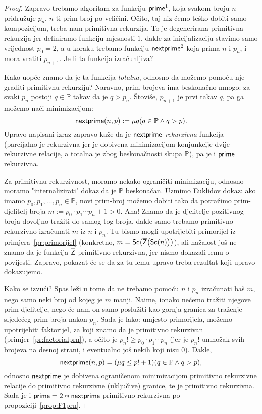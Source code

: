 \begin{proof}
Zapravo trebamo algoritam za funkciju $\mathsf{prime}^1$, koja svakom broju $n$ pridružuje $p_n$, $n$-ti prim-broj po veličini. Očito, taj niz ćemo teško dobiti samo kompozicijom, treba nam primitivna rekurzija. To je degenerirana primitivna rekurzija jer definiramo funkciju mjesnosti $1$, dakle za inicijalizaciju stavimo samo vrijednost $p_0=2$, a u koraku trebamo funkciju $\mathsf{nextprime}^2$ koja prima $n$ i $p_n$, i mora vratiti $p_{n+1}$. Je li ta funkcija izračunljiva?

Kako uopće znamo da je ta funkcija \emph{totalna}, odnosno da možemo pomoću nje graditi primitivnu rekurziju? Naravno, prim-brojeva ima beskonačno mnogo: za svaki $p_n$ postoji $q\in\mathbb P$ takav da je $q>p_n$. Štoviše, $p_{n+1}$ je prvi takav $q$, pa ga možemo naći minimizacijom:
\begin{equation}
    \mathsf{nextprime}(n,p):=\mu q(q\in\mathbb P\land q>p)\text.
\end{equation}
Upravo napisani izraz zapravo kaže da je $\mathsf{nextprime}$ \emph{rekurzivna} funkcija (parcijalno je rekurzivna jer je dobivena minimizacijom konjunkcije dvije rekurzivne relacije, a totalna je zbog beskonačnosti skupa $\mathbb P$), pa je i $\mathsf{prime}$ rekurzivna.

Za primitivnu rekurzivnost, moramo nekako ograničiti minimizaciju, odnosno moramo "internalizirati" dokaz da je $\mathbb P$ beskonačan. Uzmimo Euklidov dokaz: ako imamo $p_0,p_1,\dotsc,p_n\in\mathbb P$, novi prim-broj možemo dobiti tako da potražimo prim-djelitelj broja $m:=p_0\cdot p_1\dotsm p_n+1>0$. Aha! Znamo da je djelitelje pozitivnog broja dovoljno tražiti do samog tog broja, dakle samo trebamo primitivno rekurzivno izračunati $m$ iz $n$ i $p_n$. Tu bismo mogli upotrijebiti primorijel iz primjera~\ref{pr:primorijel} (konkretno, $m=\mathsf{Sc}\bigl(\overline{\mathsf Z}\bigl(\mathsf{Sc}(n)\bigr)\bigr)$), ali nažalost još ne znamo da je funkcija $\overline{\mathsf Z}$ primitivno rekurzivna, jer nismo dokazali lemu o povijesti. Zapravo, pokazat će se da za tu lemu upravo treba rezultat koji upravo dokazujemo.

Kako se izvući? Spas leži u tome da ne trebamo pomoću $n$ i $p_n$ izračunati baš $m$, nego samo neki broj od kojeg je $m$ manji. Naime, ionako nećemo tražiti njegove prim-djelitelje, nego će nam on samo poslužiti kao gornja granica za traženje sljedećeg prim-broja nakon $p_n$. Sada je lako: umjesto primorijela, možemo upotrijebiti faktorijel, za koji znamo da je primitivno rekurzivan (primjer~\ref{pr:factorialprn}), a očito je $p_n!\ge p_0\cdot p_1\dotsm p_n$ (jer je $p_n!$ umnožak svih brojeva na desnoj strani, i eventualno još nekih koji nisu $0$). Dakle, 
\begin{equation}
    \mathsf{nextprime}(n,p)=(\mu q\le p!+1)(q\in\mathbb P\land q>p)\text,
\end{equation}
odnosno $\mathsf{nextprime}$ je dobivena ograničenom minimizacijom primitivno rekurzivne relacije do primitivno rekurzivne (uključive) granice, te je primitivno rekurzivna. Sada je i $\f{prime}=2\pr\f{nextprime}$ primitivno rekurzivna po propoziciji~\ref{prop:F1prn}.
\end{proof}

